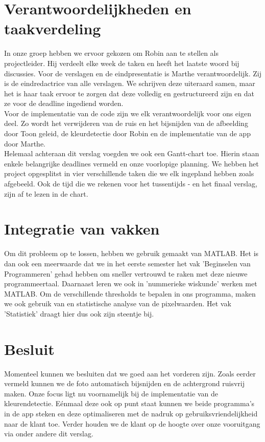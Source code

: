 \documentclass[a4paper,kulak]{kulakarticle}
\begin{document}
\section{Verantwoordelijkheden en taakverdeling}		
In onze groep hebben we ervoor gekozen om Robin aan te stellen als projectleider. Hij verdeelt elke week de taken en heeft het laatste woord bij discussies. 
Voor de verslagen en de eindpresentatie is Marthe verantwoordelijk. Zij is de eindredactrice van alle verslagen. We schrijven deze uiteraard samen, maar het is haar taak ervoor te zorgen dat deze volledig en gestructureerd zijn en dat ze voor de deadline ingediend worden.\\
Voor de implementatie van de code zijn we elk verantwoordelijk voor ons eigen deel. Zo wordt het verwijderen van de ruis en het bijsnijden van de afbeelding door Toon geleid, de kleurdetectie door Robin en de implementatie van de app door Marthe.\\
Helemaal achteraan dit verslag voegden we ook een Gantt-chart toe. Hierin staan enkele belangrijke deadlines vermeld en onze voorlopige planning. We hebben het project opgesplitst in vier verschillende taken die we elk ingepland hebben zoals afgebeeld. Ook de tijd die we rekenen voor het tussentijds - en het finaal verslag, zijn af te lezen in de chart.

\section{Integratie van vakken}
Om dit probleem op te lossen, hebben we gebruik gemaakt van MATLAB. Het is dan ook een meerwaarde dat we in het eerste semester het vak 'Beginselen van Programmeren' gehad hebben om sneller vertrouwd te raken met deze nieuwe programmeertaal. Daarnaast leren we ook in 'nummerieke wiskunde' werken met MATLAB. Om de verschillende thresholds te bepalen in ons programma, maken we ook gebruik van en statistische analyse van de pixelwaarden. Het vak 'Statistiek' draagt hier dus ook zijn steentje bij.

\section{Besluit}	
Momenteel kunnen we besluiten dat we goed aan het vorderen zijn. Zoals eerder vermeld kunnen we de foto automatisch bijsnijden en de achtergrond ruisvrij maken. Onze focus ligt nu voornamelijk bij de implementatie van de kleurendetectie. Eénmaal deze ook op punt staat kunnen we beide programma's in de app steken en deze optimaliseren met de nadruk op gebruiksvriendelijkheid naar de klant toe. Verder houden we de klant op de hoogte over onze vooruitgang via onder andere dit verslag. 
	
	
		
	
	
\end{document}
